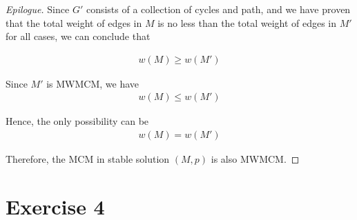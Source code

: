 \documentclass[11pt,a4paper]{article}
\begin{document}
\begin{proof}[Epilogue]
    Since $G'$ consists of a collection of cycles
    and path, and we have proven that the total weight of edges
    in $M$ is no less than the total weight of edges in $M'$ for all cases, we
    can conclude that

    \begin{align}
        w (M) \geq w (M')
    \end{align}

    Since $M'$ is MWMCM, we have
    \begin{align}
        w (M) \leq w (M')
    \end{align}

    Hence, the only possibility can be
    \begin{align}
        w (M) = w (M')
    \end{align}

    Therefore, the MCM in stable solution $(M,p)$ is also MWMCM.
\end{proof}

\newpage
\section{Exercise 4}

\end{document}
